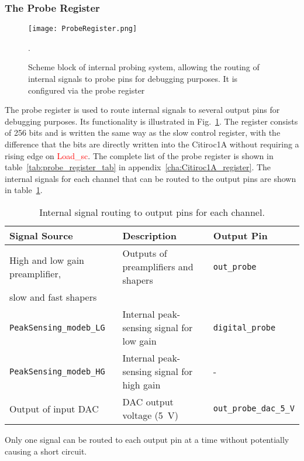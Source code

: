 \subsubsection{The Probe Register}\label{sec:probe_register}
\begin{figure}[H]
    \centering
    \texttt{[image: ProbeRegister.png]}
    \caption{Scheme block of internal probing system, allowing the routing of internal signals to probe pins for debugging purposes. It is configured via the probe register\autocite{datasheetCITIROC}}.
    \label{fig:CITIROC1A_proberegiseter}
\end{figure}
The probe register is used to route internal signals to several output pins for debugging purposes.
Its functionality is illustrated in Fig.~\ref{fig:CITIROC1A_proberegiseter}.
The register consists of 256 bits and is written the same way as the slow control register,
 with the difference that the bits are directly written into the Citiroc1A without requiring a rising edge on \textcolor{red}{Load\_sc}\autocite{datasheetCITIROC}.
\newline
 The complete list of the probe register is shown in table~\ref{tab:probe_register_tab} in appendix~\ref{cha:Citiroc1A_register}.
\newline
The internal signals for each channel that can be routed to the output pins are shown in table~\ref{tab:probe_register}. 
 \begin{table}[H]
    \centering
    \begin{tabular}{@{}lll@{}}
    \toprule
    \textbf{Signal Source} & \textbf{Description}                   & \textbf{Output Pin}        \\ \midrule
    High and low gain preamplifier, & Outputs of preamplifiers and shapers & \texttt{out\_probe}        \\
    slow and fast shapers                                                   &                          \\ \midrule
    \texttt{PeakSensing\_modeb\_LG} & Internal peak-sensing signal for low gain & \texttt{digital\_probe}    \\
    \texttt{PeakSensing\_modeb\_HG} & Internal peak-sensing signal for high gain & -    \\ \midrule
    Output of input DAC            & DAC output voltage (\SI{5}{\volt})  & \texttt{out\_probe\_dac\_5\_V} \\ \bottomrule
    \end{tabular}
    \caption{Internal signal routing to output pins for each channel\autocite{datasheetCITIROC}.}
    \label{tab:probe_register}
\end{table}
Only one signal can be routed to each output pin at a time without potentially causing a short circuit\autocite{datasheetCITIROC}.
